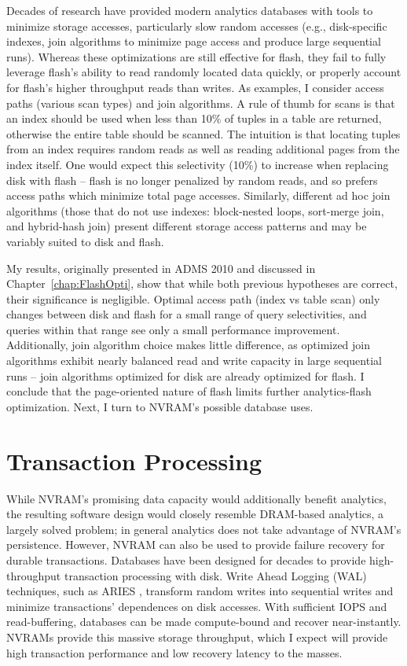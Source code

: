 Decades of research have provided modern analytics databases with tools to minimize storage accesses, particularly slow random accesses (e.g., disk-specific indexes, join algorithms to minimize page access and produce large sequential runs).
Whereas these optimizations are still effective for flash, they fail to fully leverage flash's ability to read randomly located data quickly, or properly account for flash's higher throughput reads than writes.
As examples, I consider access paths (various scan types) and join algorithms.
A rule of thumb for scans is that an index should be used when less than 10\% of tuples in a table are returned, otherwise the entire table should be scanned.
The intuition is that locating tuples from an index requires random reads as well as reading additional pages from the index itself.
One would expect this selectivity (10\%) to increase when replacing disk with flash -- flash is no longer penalized by random reads, and so prefers access paths which minimize total page accesses.
Similarly, different ad hoc join algorithms (those that do not use indexes: block-nested loops, sort-merge join, and hybrid-hash join) present different storage access patterns and may be variably suited to disk and flash.

My results, originally presented in ADMS 2010 \cite{PelleyWenisch11} and discussed in Chapter~\ref{chap:FlashOpti}, show that while both previous hypotheses are correct, their significance is negligible.
Optimal access path (index vs table scan) only changes between disk and flash for a small range of query selectivities, and queries within that range see only a small performance improvement.
Additionally, join algorithm choice makes little difference, as optimized join algorithms exhibit nearly balanced read and write capacity in large sequential runs -- join algorithms optimized for disk are already optimized for flash.
I conclude that the page-oriented nature of flash limits further analytics-flash optimization.
Next, I turn to NVRAM's possible database uses.

\section{Transaction Processing}
\label{sec:Intro:OLTP}

While NVRAM's promising data capacity would additionally benefit analytics, the resulting software design would closely resemble DRAM-based analytics, a largely solved problem; in general analytics does not take advantage of NVRAM's persistence.
However, NVRAM can also be used to provide failure recovery for durable transactions.
Databases have been designed for decades to provide high-throughput transaction processing with disk.
Write Ahead Logging (WAL) techniques, such as ARIES \cite{MohanHaderle92}, transform random writes into sequential writes and minimize transactions' dependences on disk accesses.
With sufficient IOPS and read-buffering, databases can be made compute-bound and recover near-instantly.
NVRAMs provide this massive storage throughput, which I expect will provide high transaction performance and low recovery latency to the masses.

